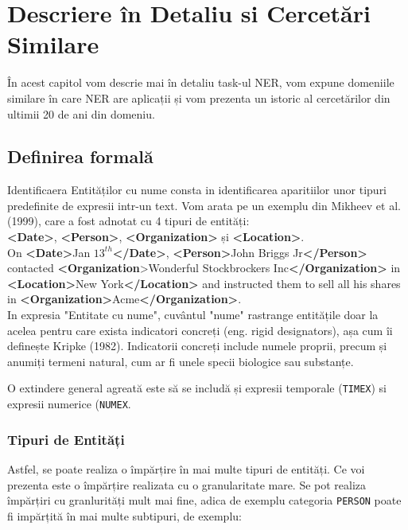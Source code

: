 \chapter{Descriere în Detaliu si Cercetări Similare}
\label{chapter:history}

În acest capitol vom descrie mai în detaliu task-ul NER, vom expune domeniile similare în care NER are aplicații și vom prezenta un istoric al cercetărilor din ultimii 20 de ani din domeniu.

\section{Definirea formală}

Identificaera Entităților cu nume consta in identificarea aparitiilor unor tipuri predefinite de expresii intr-un text. Vom arata pe un exemplu din Mikheev et al. (1999)\cite{mikheev1999}, care a fost adnotat cu 4 tipuri de entități:\\

\textbf{<Date>}, \textbf{<Person>}, \textbf{<Organization>} și \textbf{<Location>}.\\


On \textbf{<Date>}Jan $13^{th}$\textbf{</Date>}, \textbf{<Person>}John Briggs Jr\textbf{</Person>} contacted
\textbf{<Organization}>Wonderful Stockbrockers Inc\textbf{</Organization>} in\textbf{ <Location>}New
York\textbf{</Location>} and instructed them to sell all his shares in
\textbf{<Organization>}Acme\textbf{</Organization>}.\\

In expresia "Entitate cu nume", cuvântul "nume" rastrange entitățile doar la acelea pentru care exista indicatori concreți (eng. rigid designators), așa cum îi definește Kripke (1982). Indicatorii concreți include numele proprii, precum și anumiți termeni natural, cum ar fi unele specii biologice sau substanțe.

O extindere general agreată este să se includă și expresii temporale (\texttt{TIMEX}) si expresii numerice (\texttt{NUMEX}.

\subsection{Tipuri de Entități}

Astfel, se poate realiza o împărțire în mai multe tipuri de entități. Ce voi prezenta este o împărțire realizata cu o granularitate mare. Se pot realiza împărțiri cu granlurități mult mai fine, adica de exemplu categoria \texttt{PERSON} poate fi impărțită în mai multe subtipuri, de exemplu:

